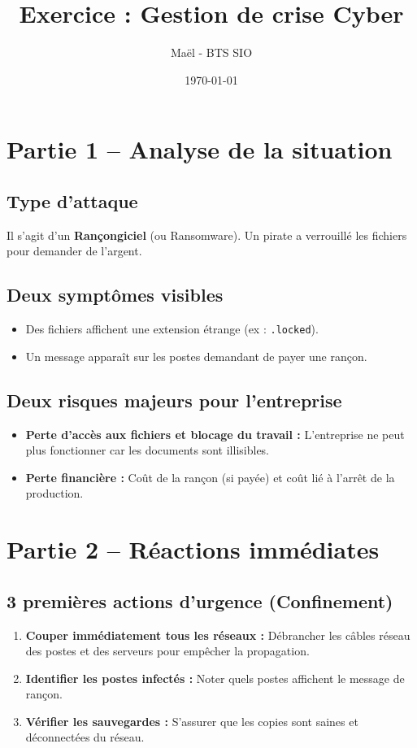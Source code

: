 \documentclass[a4paper,12pt]{article}
\title{\textbf{Exercice : Gestion de crise Cyber}}
\author{Maël - BTS SIO}
\date{\today}
\begin{document}
\maketitle

\section{Partie 1 -- Analyse de la situation}

\subsection*{Type d'attaque}
Il s'agit d'un \textbf{Rançongiciel} (ou Ransomware). Un pirate a verrouillé les fichiers pour demander de l'argent.

\subsection*{Deux symptômes visibles}
\begin{itemize}
    \item Des fichiers affichent une extension étrange (ex : \texttt{.locked}).
    \item Un message apparaît sur les postes demandant de payer une rançon.
\end{itemize}

\subsection*{Deux risques majeurs pour l'entreprise}
\begin{itemize}
    \item \textbf{Perte d'accès aux fichiers et blocage du travail :} L'entreprise ne peut plus fonctionner car les documents sont illisibles.
    \item \textbf{Perte financière :} Coût de la rançon (si payée) et coût lié à l'arrêt de la production.
\end{itemize}

\section{Partie 2 -- Réactions immédiates}

\subsection*{3 premières actions d'urgence (Confinement)}
\begin{enumerate}
    \item \textbf{Couper immédiatement tous les réseaux :} Débrancher les câbles réseau des postes et des serveurs pour empêcher la propagation.
    \item \textbf{Identifier les postes infectés :} Noter quels postes affichent le message de rançon.
    \item \textbf{Vérifier les sauvegardes :} S'assurer que les copies sont saines et déconnectées du réseau.
\end{enumerate}
\end{document}
